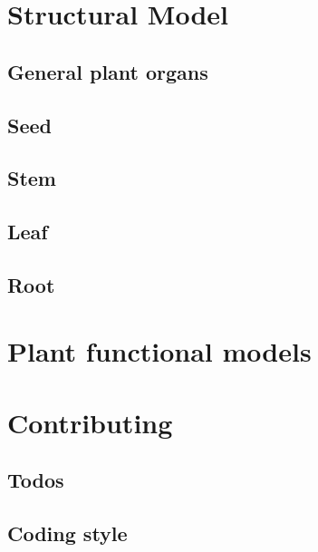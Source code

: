 \documentclass[a4paper]{article}
\begin{document}
\section{Structural Model}

\subsection{General plant organs}

\subsection{Seed}

\subsection{Stem}

\subsection{Leaf}

\subsection{Root}



\section{Plant functional models}

%

%




\section{Contributing}
%

\subsection{Todos}

\subsection{Coding style}



\newpage

 
\end{document}
